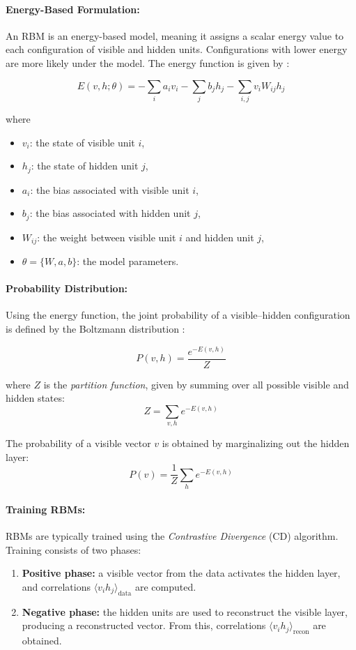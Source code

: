 \paragraph{Energy-Based Formulation: } 
An RBM is an energy-based model, meaning it assigns a scalar energy value to each configuration of visible and hidden units. Configurations with lower energy are more likely under the model. The energy function is given by \cite{kong2019improved, zhang2016short}:

\[
E(v,h;\theta) = -\sum_i a_i v_i - \sum_j b_j h_j - \sum_{i,j} v_i W_{ij} h_j
\tag{12}
\label{eqn:12}
\]

where
\begin{itemize}
	\item $v_i$: the state of visible unit $i$,
	\item $h_j$: the state of hidden unit $j$,
	\item $a_i$: the bias associated with visible unit $i$,
	\item $b_j$: the bias associated with hidden unit $j$,
	\item $W_{ij}$: the weight between visible unit $i$ and hidden unit $j$,
	\item $\theta = \{W, a, b\}$: the model parameters.
\end{itemize}

\paragraph{Probability Distribution: } 
Using the energy function, the joint probability of a visible–hidden configuration is defined by the Boltzmann distribution \cite{DBN_GeeksforGeeks}:

\[
P(v,h) = \frac{e^{-E(v,h)}}{Z}
\tag{13}
\label{eqn:13}
\]

where $Z$ is the \textit{partition function}, given by summing over all possible visible and hidden states:
\[
Z = \sum_{v,h} e^{-E(v,h)}
\]

The probability of a visible vector $v$ is obtained by marginalizing out the hidden layer:
\[
P(v) = \frac{1}{Z} \sum_{h} e^{-E(v,h)}
\]

\paragraph{Training RBMs:} 
RBMs are typically trained using the \textit{Contrastive Divergence} (CD) algorithm. Training consists of two phases:

\begin{enumerate}
	\item \textbf{Positive phase:} a visible vector from the data activates the hidden layer, and correlations $\langle v_i h_j \rangle_{\text{data}}$ are computed.
	\item \textbf{Negative phase:} the hidden units are used to reconstruct the visible layer, producing a reconstructed vector. From this, correlations $\langle v_i h_j \rangle_{\text{recon}}$ are obtained.
\end{enumerate}

